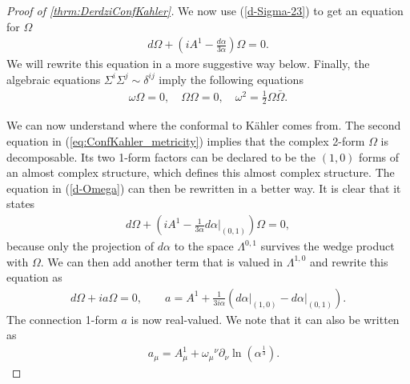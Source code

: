 \documentclass[10pt]{report}
\theoremstyle{definition}
\begin{document}
\begin{proof}[Proof of \cref{thrm:DerdziConfKahler}]
  We now use (\ref{d-Sigma-23}) to get an equation for $\Omega$
    \begin{align}\label{d-Omega}
        d\Omega +\left( i A^1 - \frac{d\alpha}{3\alpha}\right) \Omega = 0.
        \end{align}
We will rewrite this equation in a more suggestive way below.    
Finally, the algebraic equations $\Sigma^i\Sigma^j\sim \delta^{ij}$ imply the following equations
    \begin{align}
        \omega \Omega = 0, \quad \Omega \Omega = 0, \quad \omega^2 = \frac{1}{2}\Omega \bar{\Omega} \label{eq:ConfKahler_metricity}.
    \end{align}
    
    We can now understand where the conformal to K\"ahler comes from. The second equation in (\ref{eq:ConfKahler_metricity}) implies that the complex 2-form $\Omega$ is decomposable. Its two 1-form factors can be declared to be the $(1,0)$ forms of an almost complex structure, which defines this almost complex structure. The equation in (\ref{d-Omega}) can then be rewritten in a better way. It is clear that it states
    \begin{align}
        d\Omega +\left( i A^1 - \frac{1}{3\alpha} d\alpha \Big|_{(0,1)} \right) \Omega = 0,
        \end{align}
        because only the projection of $d\alpha$ to the space $\Lambda^{0,1}$ survives the wedge product with $\Omega$. We can then add another term that is valued in $\Lambda^{1,0}$ and rewrite this equation as 
          \begin{align}
        d\Omega +i a \Omega = 0, \qquad a = A^1 + \frac{1}{3i \alpha} ( d\alpha \Big|_{(1,0)}  - d\alpha \Big|_{(0,1)} ).\label{eq:ConfKahler_IntegrableComplexStrcture}
        \end{align}
        The connection 1-form $a$ is now real-valued. We note that it can also be written as       
        \begin{align}
        \quad a_\mu = A^1_\mu + \omega_\mu{}^\nu \partial_\nu \ln\left(\alpha^\frac{1}{3}\right). 
    \end{align}
    

\end{proof}
\end{document}
